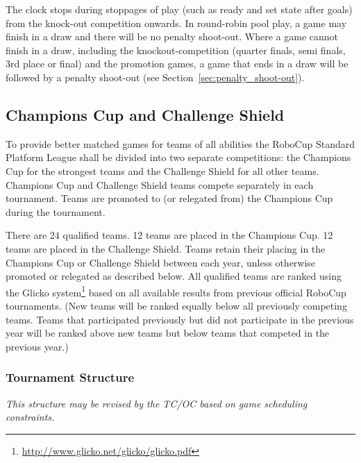 The clock stops during stoppages of play (such as ready and set state after goals) from the knock-out competition onwards.  In round-robin pool play, a game may finish in a draw and there will be no penalty shoot-out. Where a game cannot finish in a draw, including the knockout-competition (quarter finals, semi finals, 3rd place or final) and the promotion games, a game that ends in a draw will be followed by a penalty shoot-out (see Section~\ref{sec:penalty_shoot-out}).

\subsection{Champions Cup and Challenge Shield}
\label{sec:twoCompetitions}

To provide better matched games for teams of all abilities the RoboCup Standard Platform League shall be divided into two separate competitions: the Champions Cup for the strongest teams and the Challenge Shield for all other teams. Champions Cup and Challenge Shield teams compete separately in each tournament. Teams are promoted to (or relegated from) the Champions Cup during the tournament. 

There are 24 qualified teams. 12 teams are placed in the Champions Cup. 12 teams are placed in the Challenge Shield. Teams retain their placing in the Champions Cup or Challenge Shield between each year, unless otherwise promoted or relegated as described below. 
All qualified teams are ranked using the Glicko system\footnote{\url{http://www.glicko.net/glicko/glicko.pdf}} based on all available results from previous official RoboCup tournaments. (New teams will be ranked equally below all previously competing teams. Teams that participated previously but did not participate in the previous year will be ranked above new teams but below teams that competed in the previous year.)

\subsubsection{Tournament Structure}
\emph{This structure may be revised by the TC/OC based on game scheduling constraints.} 


